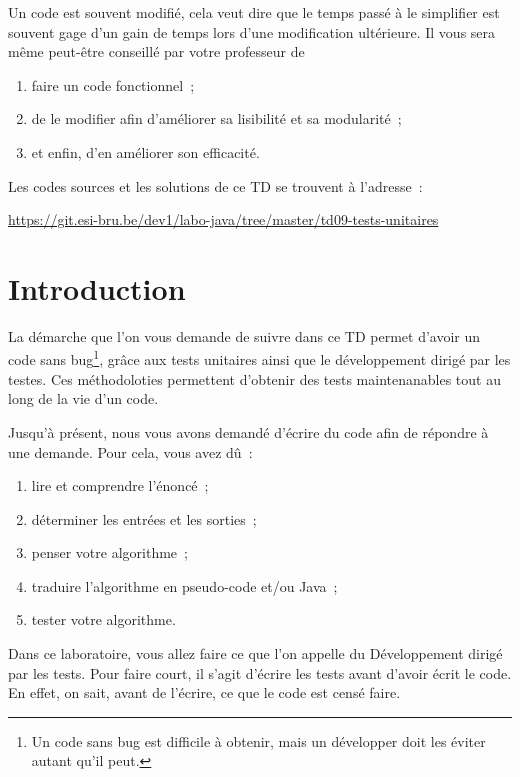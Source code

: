 \documentclass[a4paper,11pt]{article}
\date{2018 -- 2019}
\newcommand{\publicbasepath}
{https://git.esi-bru.be/dev1/labo-java/tree/master/td09-tests-unitaires}
\begin{document}
\entete
\titre
{}
\lastedit


	Un code est souvent modifié, cela veut dire que le temps passé à le simplifier est souvent gage d’un gain de temps lors d’une modification ultérieure. Il vous sera même peut-être conseillé par votre professeur de 
	\begin{enumerate}
		\item faire un code fonctionnel~;
		\item de le modifier afin d’améliorer sa lisibilité et sa modularité~;
		\item et enfin, d’en améliorer son efficacité.
	\end{enumerate} 
	
		Les codes sources et les solutions de ce TD se trouvent à l'adresse~: 
	
	\url{\publicbasepath}	

		 
	\tableofcontents

	\newpage




\section{Introduction}

	La démarche que l'on vous demande de suivre dans ce TD permet d'avoir un code sans bug\footnote{Un code sans bug est difficile à obtenir, mais un développer doit les éviter autant qu'il peut.}, grâce aux tests unitaires ainsi que le développement dirigé par les testes. Ces méthodoloties permettent d'obtenir des tests maintenanables tout au long de la vie d'un code.

	Jusqu'à présent, nous vous avons demandé d'écrire du code afin de répondre à une demande. Pour cela, vous avez dû~:
	\begin{enumerate}
		\item lire et comprendre l'énoncé~;
		\item déterminer les entrées et les sorties~;
		\item penser votre algorithme~;
		\item traduire l'algorithme en pseudo-code et/ou Java~;
		\item tester votre algorithme.
	\end{enumerate}

	Dans ce laboratoire, vous allez faire ce que l'on appelle du Développement dirigé par les tests. Pour faire court, il s'agit d'écrire les tests avant d'avoir écrit le code. En effet, on sait, avant de l'écrire, ce que le code est censé faire.
\end{document}
